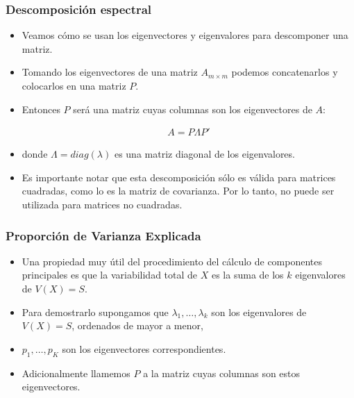 \documentclass[
  shownotes,
  xcolor={svgnames},
  hyperref={colorlinks,citecolor=DarkBlue,linkcolor=DarkRed,urlcolor=DarkBlue}
  , aspectratio=169]{beamer}
\begin{document}
\begin{frame}
\frametitle{Descomposición espectral}


\begin{itemize}

\item Veamos cómo se usan los eigenvectores y eigenvalores para descomponer una matriz. 
\medskip
\item Tomando los eigenvectores de una matriz \(A_{m\times m}\) podemos concatenarlos y colocarlos en una matriz \(P\).
\medskip
\item  Entonces \(P\) será una matriz cuyas columnas son los eigenvectores de \(A\):

\begin{align}
A= P\Lambda P'
\end{align}

\item donde \(\Lambda =diag(\lambda)\) es una matriz diagonal de los eigenvalores.
\medskip
\item Es importante notar que esta descomposición sólo es válida para matrices cuadradas, como lo es la matriz de covarianza. Por lo tanto, no puede ser utilizada para matrices no cuadradas.
\end{itemize}
\end{frame}

\begin{frame}
\frametitle{Proporción de Varianza Explicada}

\begin{itemize}


\item Una propiedad muy útil del procedimiento del cálculo de componentes  principales es que la variabilidad total de \(X\) es la suma de los
 \(k\) eigenvalores de \(V(X)=S\). 
 \item Para demostrarlo supongamos que \(\lambda_1,\dots,\lambda_k\) son los eigenvalores de \(V(X)=S\),  ordenados de mayor a menor, 
 \item  \(p_1 , \dots , p_K\) son los  eigenvectores correspondientes. 
 \item Adicionalmente llamemos \(P\) a la  matriz cuyas columnas son estos eigenvectores.

\end{itemize}
\end{frame}
\end{document}
